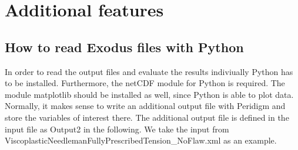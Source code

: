 % 
%               
%          
% 
\section{Additional features}
\subsection{How to read Exodus files with Python}
 In order to read the output files and evaluate the results indiviually Python has to be installed. Furthermore, the netCDF module for Python is required.
 The module matplotlib should be installed as well, since Python is able to plot data. \\ 
 Normally, it makes sense to write an additional output file with Peridigm and store the variables of interest there. The additional output file is defined in the 
 input file as Output2 in the following. We take the input from ViscoplasticNeedlemanFullyPrescribedTension\_NoFlaw.xml as an example.
